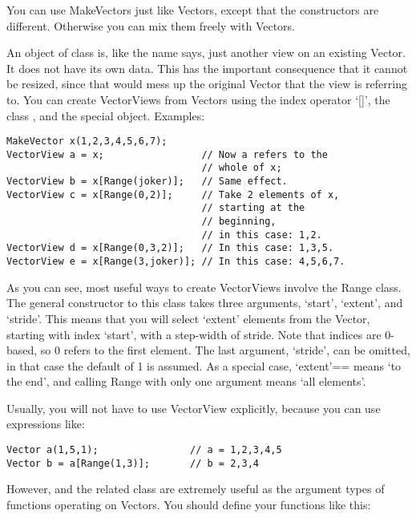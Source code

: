 You can use MakeVectors just like Vectors, except that the
constructors are different. Otherwise you can mix them freely with
Vectors. 

\label{sec:vector_views}

An object of class  is, like the name says, just
another view on an existing Vector. It does not have its own
data. This has the important consequence that it cannot be resized,
since that would mess up the original Vector that the view is
referring to. You can create VectorViews from Vectors using the index
operator `[]', the class , and the special 
object. Examples:

\begin{verbatim}
MakeVector x(1,2,3,4,5,6,7); 
VectorView a = x;                 // Now a refers to the 
                                  // whole of x;
VectorView b = x[Range(joker)];   // Same effect.
VectorView c = x[Range(0,2)];     // Take 2 elements of x, 
                                  // starting at the 
                                  // beginning,
                                  // in this case: 1,2.
VectorView d = x[Range(0,3,2)];   // In this case: 1,3,5.
VectorView e = x[Range(3,joker)]; // In this case: 4,5,6,7.
\end{verbatim}

As you can see, most useful ways to create VectorViews involve the
Range class. The general constructor to this class takes three
arguments, `start', `extent', and `stride'. This means that you will
select `extent' elements from the Vector, starting with index `start',
with a step-width of stride. Note that indices are 0-based, so 0
refers to the first element. The last argument, `stride', can be
omitted, in that case the default of 1 is assumed. As a special case,
`extent'== means `to the end', and calling Range with only one
argument  means `all elements'.

Usually, you will not have to use VectorView explicitly, because you
can use expressions like:

\begin{verbatim}
Vector a(1,5,1);                // a = 1,2,3,4,5
Vector b = a[Range(1,3)];       // b = 2,3,4
\end{verbatim}

However,  and the related class
 are extremely useful as the argument types of
functions operating on Vectors. You should define your functions like
this:

